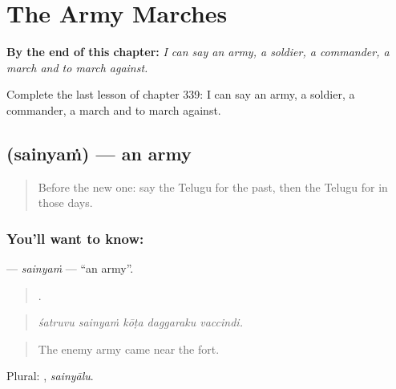 
\chapter{The Army Marches}
\label{ch:te-the-army-marches}

\begin{chapteropening}
\textbf{By the end of this chapter:} \emph{I can say an army, a soldier, a commander, a march and to march against.}

Complete the last lesson of chapter 339: I can say an army, a soldier, a commander, a march and to march against.
\end{chapteropening}

\section[\texorpdfstring{\te{సైన్యం} (sainyaṁ)}{సైన్యం (sainyaṁ)}]{ (sainyaṁ) — an army}

\label{lesson:TE-C339-sainyam}



\begin{quote}
Before the new one: say the Telugu for the past, then the Telugu for in those days.
\end{quote}

\subsection*{You'll want to know: }
\textbf{} — \emph{sainyaṁ} — \textquotedblleft{}an army\textquotedblright{}.

\begin{quote}
    .
\end{quote}

\begin{quote}
\emph{śatruvu sainyaṁ kōṭa daggaraku vaccindi.}
\end{quote}

\begin{quote}
The enemy army came near the fort.
\end{quote}

Plural: , \emph{sainyālu}.

